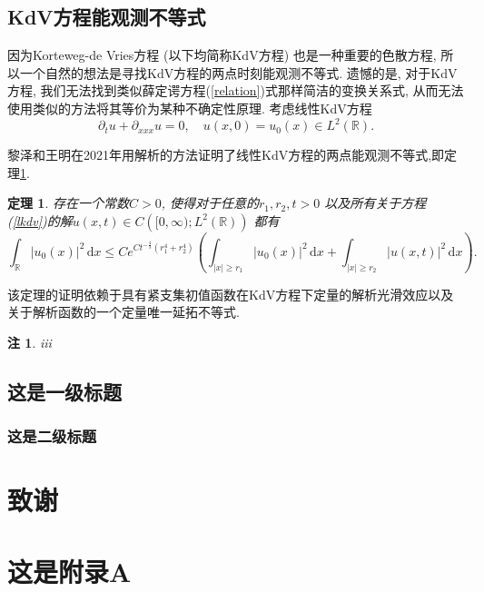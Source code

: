 \documentclass[master]{cugthesis}
\newcommand\R{\ensuremath{\mathbb{R}}}
\renewcommand\d{\ensuremath{\,\mathrm{d}}}
\newtheorem{theorem}{定理}[section]
\newtheorem*{remark}{注}
\begin{document}
    \section{KdV方程能观测不等式} 

    因为Korteweg-de Vries方程 (以下均简称KdV方程) 也是一种重要的色散方程,  所以一个自然的想法是寻找KdV方程的两点时刻能观测不等式. 遗憾的是, 对于KdV方程, 我们无法找到类似薛定谔方程(\ref{relation})式那样简洁的变换关系式, 从而无法使用类似的方法将其等价为某种不确定性原理. 考虑线性KdV方程
    \begin{equation}
      \partial_t u+\partial_{x x x} u=0,\quad u(x,0)=u_0(x) \in L^2(\R).\label{lkdv}
    \end{equation}


黎泽和王明在2021年用解析的方法证明了线性KdV方程的两点能观测不等式\cite{Ming2021},即定理\ref{thm-2}.
    \begin{theorem}\label{thm-2}
      存在一个常数$C>0$, 使得对于任意的$r_1,r_2,t>0$ 以及所有关于方程(\ref{lkdv})的解$u(x,t)\in C\left( [0,\infty);L^2(\R) \right) $ 都有
      \begin{equation}
	\int_{\R}|u_0(x)|^2\d x\le C e^{Ct ^{- \frac{4}{3}}(r_1^{4}+r_2^{4})}\left( \int_{|x|\ge r_1}|u_0(x)|^2 \d x+ \int_{|x|\ge r_2}|u(x,t)|^2\d x \right). 
      \end{equation}
    \end{theorem}
该定理的证明依赖于具有紧支集初值函数在KdV方程下定量的解析光滑效应以及关于解析函数的一个定量唯一延拓不等式.

\begin{remark}
 iii 
\end{remark}

    \section{这是一级标题}
    \subsection{这是二级标题}

    \backmatter
    \chapter{致谢}

    \appendix
    \chapter{这是附录A}
\end{document}
